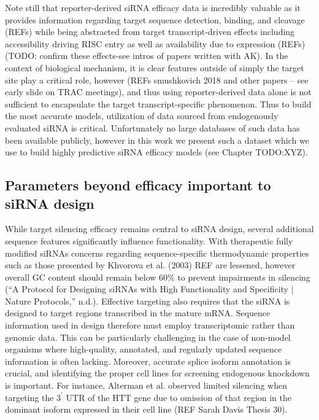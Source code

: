 \documentclass{report}
\begin{document}
Note still that reporter-derived siRNA efficacy data is incredibly valuable as it provides information regarding target sequence detection, binding, and cleavage (REFs) while being abstracted from target transcript-driven effects including accessibility driving RISC entry as well as availability due to expression (REFs) (TODO: confirm these effects-see intros of papers written with AK). In the context of biological mechanism, it is clear features outside of simply the target site play a critical role, however (REFs smushkovich 2018 and other papers – see early slide on TRAC meetings), and thus using reporter-derived data alone is not sufficient to encapsulate the target transcript-specific phenomenon. Thus to build the most accurate models, utilization of data sourced from endogenously evaluated siRNA is critical. Unfortunately no large databases of such data has been available publicly, however in this work we present such a dataset which we use to build highly predictive siRNA efficacy models (see Chapter TODO:XYZ).




\subsection{Parameters beyond efficacy important to siRNA design}\label{sec:other sirna parameters} 
While target silencing efficacy remains central to siRNA design, several additional sequence features significantly influence functionality. With therapeutic fully modified siRNAs concerns regarding sequence-specific thermodynamic properties such as those presented by Khvorova et al. (2003) REF are lessened, however overall GC content should remain below 60\% to prevent impairments in silencing (“A Protocol for Designing siRNAs with High Functionality and Specificity | Nature Protocols,” n.d.).
Effective targeting also requires that the siRNA is designed to target regions transcribed in the mature mRNA. Sequence information used in design therefore must employ transcriptomic rather than genomic data. This can be particularly challenging in the case of non-model organisms where high-quality, annotated, and regularly updated sequence information is often lacking. Moreover, accurate splice isoform annotation is crucial, and identifying the proper cell lines for screening endogenous knockdown is important. For instance, Alterman et al. observed limited silencing when targeting the $3^\prime$ UTR of the HTT gene due to omission of that region in the dominant isoform expressed in their cell line (REF Sarah Davis Thesis 30). 
\end{document}
